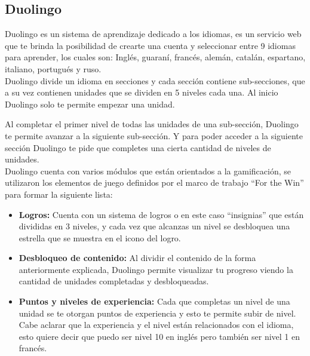     
\begin{multicols*}{2}    
\subsection*{Duolingo}
    
Duolingo es un sistema de aprendizaje dedicado a los idiomas, es un servicio web que
te brinda la posibilidad de crearte una cuenta y seleccionar entre 9 idiomas para aprender,
los cuales son: Inglés, guaraní, francés, alemán, catalán, espartano, italiano, portugués y ruso.\\

\noindent Duolingo divide un idioma en secciones y cada sección contiene sub-secciones,
que a su vez contienen unidades que se dividen en 5 niveles cada una. Al inicio Duolingo
solo te permite empezar una unidad.
    
\noindent Al completar el primer nivel de todas las unidades de una sub-sección,
Duolingo te permite avanzar a la siguiente sub-sección. Y para poder acceder a la siguiente
sección Duolingo te pide que completes una cierta cantidad de niveles de unidades.\\
    
    \noindent Duolingo cuenta con varios módulos que están orientados a la gamificación, se utilizaron
    los elementos de juego definidos por el marco de trabajo ``For the Win'' para formar la siguiente lista:
    
    \begin{itemize}
        \item {\bf Logros:} Cuenta con un sistema de logros o en este caso ``insignias''
            que están divididas en 3 niveles, y cada vez que alcanzas un nivel se 
            desbloquea una estrella que se muestra en el icono del logro.
            
        \item {\bf Desbloqueo de contenido:} Al dividir el contenido de la forma
            anteriormente explicada, Duolingo permite visualizar tu progreso viendo
            la cantidad de unidades completadas y desbloqueadas.
            
        \item {\bf Puntos y niveles de experiencia:} Cada que completas un nivel de una
        unidad se te otorgan puntos de experiencia y esto te permite subir de nivel.
        Cabe aclarar que la experiencia y el nivel están relacionados con el idioma,
        esto quiere decir que puedo ser nivel 10 en inglés pero también ser nivel 1 en francés.
        

\end{itemize}
\end{multicols*}
